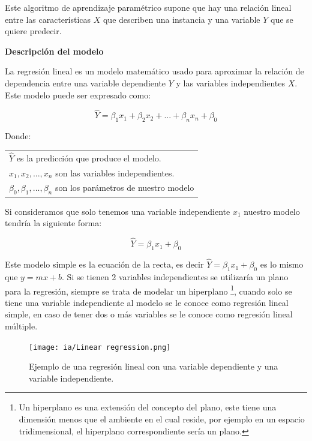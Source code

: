 \documentclass[11pt,fleqn]{book} %
\begin{document}
Este algoritmo de aprendizaje paramétrico supone que hay una relación lineal entre las características $X$ que describen una instancia y una variable $Y$ que se quiere predecir.

\textbf{Descripción del modelo}

La regresión lineal es un modelo matemático usado para aproximar la relación de dependencia entre una variable dependiente $Y$ y las variables independientes $X$. Este modelo puede ser expresado como:

\begin{equation}
\label{eqn:linear_regression}
\hat{Y}  = \beta _1 x_1 + \beta _2 x_2 + ... + \beta _n x_n + \beta _0
\end{equation}

Donde: 

\begin{tabular}{l}
	$\hat{Y}$ es la predicción que produce el modelo.\\
$x_1,x_2,...,x_n$ son las variables independientes.\\
$\beta _0,\beta _1,...,\beta _n$ son los parámetros de nuestro modelo\\
\end{tabular}

Si consideramos que solo tenemos una variable independiente $x_1$ nuestro modelo tendría la siguiente forma:

\begin{equation}
\hat{Y}  = \beta _1 x_1 + \beta _0
\end{equation}

Este modelo simple es la ecuación de la recta, es decir $\hat{Y}  = \beta _1 x_1 + \beta _0$ es lo mismo que $y = mx + b$. Si se tienen 2 variables independientes se utilizaría un plano para la regresión, siempre se trata de modelar un hiperplano \footnote{Un hiperplano es una extensión del concepto del plano, este tiene una dimensión menos que el ambiente en el cual reside, por ejemplo en un espacio tridimensional, el hiperplano correspondiente sería un plano.}, cuando solo se tiene una variable independiente al modelo se le conoce como regresión lineal simple, en caso de tener dos o más variables se le conoce como regresión lineal múltiple.

\begin{figure}[ht]
\centering\texttt{[image: ia/Linear regression.png]}
\caption{Ejemplo de una regresión lineal con una variable dependiente y una variable independiente.}

\label{fig:LinearRegression} 
\end{figure}
\end{document}

